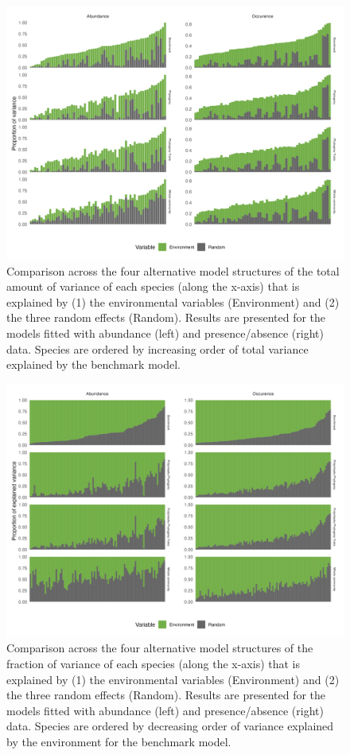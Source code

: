 \begin{figure}
\hypertarget{fig:chapt1supp24}{%
\centering
\includegraphics{03-Chapitre1/figures/supplementary/fig_supp24.png}
\caption{Comparison across the four alternative model structures of the
total amount of variance of each species (along the x-axis) that is
explained by (1) the environmental variables (Environment) and (2) the
three random effects (Random). Results are presented for the models
fitted with abundance (left) and presence/absence (right) data. Species
are ordered by increasing order of total variance explained by the
benchmark model.}\label{fig:chapt1supp24}
}
\end{figure}

\begin{figure}
\hypertarget{fig:chapt1supp23}{%
\centering
\includegraphics{03-Chapitre1/figures/supplementary/fig_supp23.png}
\caption{Comparison across the four alternative model structures of the
fraction of variance of each species (along the x-axis) that is
explained by (1) the environmental variables (Environment) and (2) the
three random effects (Random). Results are presented for the models
fitted with abundance (left) and presence/absence (right) data. Species
are ordered by decreasing order of variance explained by the environment
for the benchmark model.}\label{fig:chapt1supp23}
}
\end{figure}

